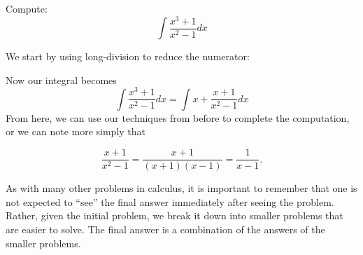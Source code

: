\documentclass{ximera}
\begin{document}
\begin{example}
  Compute:
  \[
  \int \frac{x^3+1}{x^2-1} dx
  \]
  \begin{explanation}
    We start by using long-division to reduce the numerator:
    \begin{image}[2in]
    \end{image}
    Now our integral becomes
    \[
    \int \frac{x^3+1}{x^2-1}dx = \int x+ \frac{x+1}{x^2-1}dx
    \]
    From here, we can use our techniques from before to complete the
    computation, or we can note more simply that 
    
    \[
    \frac{x+1}{x^2-1}=\frac{x+1}{(x+1)(x-1)} = \frac{1}{x-1}.
    \]
  \end{explanation}
\end{example}
    


As with many other problems in calculus, it is important to remember
that one is not expected to ``see'' the final answer immediately after
seeing the problem. Rather, given the initial problem, we break it
down into smaller problems that are easier to solve. The final answer
is a combination of the answers of the smaller problems.
\end{document}
